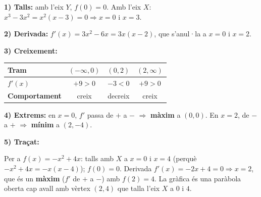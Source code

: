 \begin{exemple}[estudi complet de $f(x)=x^3-3x^2$]
\textbf{1) Talls:} amb l'eix $Y$, $f(0)=0$. Amb l'eix $X$:
$x^3-3x^2=x^2(x-3)=0\Rightarrow x=0$ i $x=3$.

\noindent\textbf{2) Derivada:} $f'(x)=3x^2-6x=3x(x-2)$, que s'anul·la a $x=0$ i $x=2$.

\noindent\textbf{3) Creixement:}
\begin{center}
\renewcommand{\arraystretch}{1.3}
\begin{tabular}{l c c c}
\toprule
\textbf{Tram} & $(-\infty,0)$ & $(0,2)$ & $(2,\infty)$ \\
\midrule
$f'(x)$ & $+9>0$ & $-3<0$ & $+9>0$ \\
\textbf{Comportament} & creix & decreix & creix \\
\bottomrule
\end{tabular}
\end{center}
\noindent\textbf{4) Extrems:} en $x=0$, $f'$ passa de $+$ a $-$ $\Rightarrow$
\textbf{màxim} a $(0,0)$. En $x=2$, de $-$ a $+$ $\Rightarrow$ \textbf{mínim} a $(2,-4)$.

\noindent\textbf{5) Traçat:}
\begin{center}

\end{center}
\end{exemple}

\begin{exemple}
Per a $f(x)=-x^2+4x$: talls amb $X$ a $x=0$ i $x=4$ (perquè $-x^2+4x=-x(x-4)$);
$f(0)=0$. Derivada $f'(x)=-2x+4=0\Rightarrow x=2$, que és un \textbf{màxim} ($f'$ de $+$
a $-$) amb $f(2)=4$. La gràfica és una paràbola oberta cap avall amb vèrtex $(2,4)$ que
talla l'eix $X$ a $0$ i $4$.
\end{exemple}

